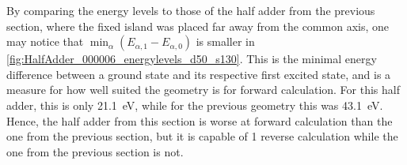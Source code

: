 \documentclass[11pt,a4paper,english,twoside]{article}
\begin{document}
By comparing the energy levels to those of the half adder from the previous section, where the fixed island was placed far away from the common axis, one may notice that $\min_\alpha(E_{\alpha,1}-E_{\alpha,0})$ is smaller in \cref{fig:HalfAdder_000006_energylevels_d50_s130}. This is the minimal energy difference between a ground state and its respective first excited state, and is a measure for how well suited the geometry is for forward calculation. For this half adder, this is only \SI{21.1}{\electronvolt}, while for the previous geometry this was \SI{43.1}{\electronvolt}. Hence, the half adder from this section is worse at forward calculation than the one from the previous section, but it is capable of 1 reverse calculation while the one from the previous section is not. \par %
\end{document}
